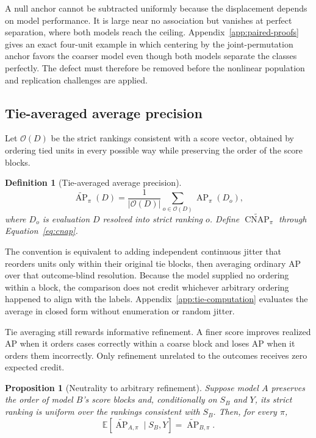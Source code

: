\documentclass[11pt]{article}
\newcommand{\AP}{\operatorname{AP}}
\newcommand{\CNAP}{\operatorname{CNAP}}
\newcommand{\E}{\mathbb{E}}
\newcommand{\APta}{\widetilde{\AP}}
\newcommand{\CNAPta}{\widetilde{\CNAP}}
\newtheorem{definition}{Definition}
\newtheorem{proposition}{Proposition}
\theoremstyle{remark}
\begin{document}
A null anchor cannot be subtracted uniformly because the displacement depends on model performance. It is large near no association but vanishes at perfect separation, where both models reach the ceiling. Appendix~\ref{app:paired-proofs} gives an exact four-unit example in which centering by the joint-permutation anchor favors the coarser model even though both models separate the classes perfectly. The defect must therefore be removed before the nonlinear population and replication challenges are applied.

\subsection{Tie-averaged average precision}
\label{sec:tie-average}

Let $\mathcal O(D)$ be the strict rankings consistent with a score vector, obtained by ordering tied units in every possible way while preserving the order of the score blocks.

\begin{definition}[Tie-averaged average precision]
\begin{equation}
\APta_\pi(D)
=
\frac{1}{|\mathcal O(D)|}
\sum_{o\in\mathcal O(D)}
\AP_\pi(D_o),
\label{eq:tie-average}
\end{equation}
where $D_o$ is evaluation $D$ resolved into strict ranking $o$. Define $\CNAPta_\pi$ through Equation~\eqref{eq:cnap}.
\end{definition}

The convention is equivalent to adding independent continuous jitter that reorders units only within their original tie blocks, then averaging ordinary AP over that outcome-blind resolution. Because the model supplied no ordering within a block, the comparison does not credit whichever arbitrary ordering happened to align with the labels. Appendix~\ref{app:tie-computation} evaluates the average in closed form without enumeration or random jitter.

Tie averaging still rewards informative refinement. A finer score improves realized AP when it orders cases correctly within a coarse block and loses AP when it orders them incorrectly. Only refinement unrelated to the outcomes receives zero expected credit.

\begin{proposition}[Neutrality to arbitrary refinement]
\label{prop:refinement}
Suppose model $A$ preserves the order of model $B$'s score blocks and, conditionally on $S_B$ and $Y$, its strict ranking is uniform over the rankings consistent with $S_B$. Then, for every $\pi$,
\[
\E\!\left[
\APta_{A,\pi}\mid S_B,Y
\right]
=
\APta_{B,\pi}.
\]
\end{proposition}
\end{document}

